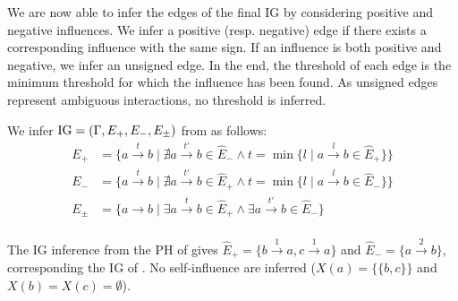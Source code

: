We are now able to infer the edges of the final IG by considering positive and negative influences. We infer a positive (resp. negative) edge if there exists a corresponding influence with the same sign. If an influence is both positive and negative, we infer an unsigned edge. In the end, the threshold of each edge is the minimum threshold for which the influence has been found. As unsigned edges represent ambiguous interactions, no threshold is inferred.
\begin{definition}\label{def:inference-IG}
We infer $\mathrm{IG} = (\Gamma,E_+,E_-,E_\pm)$ from  as follows:
\begin{align*}
E_+ &= \{a \xrightarrow{t} b \mid \nexists a \xrightarrow{t'} b \in \hat{E}_-
  \wedge t = \min \{ l \mid a \xrightarrow{l} b \in \hat{E}_+\}\} \\
E_- &= \{a \xrightarrow{t} b \mid \nexists a \xrightarrow{t'} b \in \hat{E}_+
  \wedge t = \min \{l \mid a \xrightarrow{l} b \in \hat{E}_-\}\} \\
E_\pm &= \{a \rightarrow b \mid \exists a \xrightarrow{t} b \in \hat{E}_+ \wedge \exists a \xrightarrow{t'} b \in \hat{E}_-\} \\
\end{align*}
\end{definition}


\begin{example*}
The IG inference from the PH of  gives
$\hat{E}_+ = \{b \xrightarrow{1} a, c \xrightarrow{1} a\}$ and 
$\hat{E}_- = \{a \xrightarrow{2} b\}$, corresponding the IG of .
No self-influence are inferred ($X(a) = \{ \{b,c\} \}$ and $X(b)=X(c)=\emptyset$).
\end{example*}
